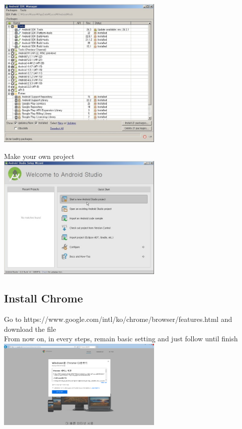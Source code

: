 \documentclass[12pt]{article}
\begin{document}
\begin{center}
\includegraphics[width=80mm,scale=1.3]{android13}
\end{center}
\newpage
\begin{center}
Make your own project\\ [1\baselineskip]
\includegraphics[width=80mm,scale=1.3]{android14}
\end{center}

\subsection{Install Chrome}
\begin{center}
Go to https://www.google.com/intl/ko/chrome/browser/features.html and download the file\\
From now on, in every steps, remain basic setting and just follow until finish\\ [1\baselineskip]
\includegraphics[width=80mm,scale=1.3]{chrome1}
\end{center}
\end{document}
